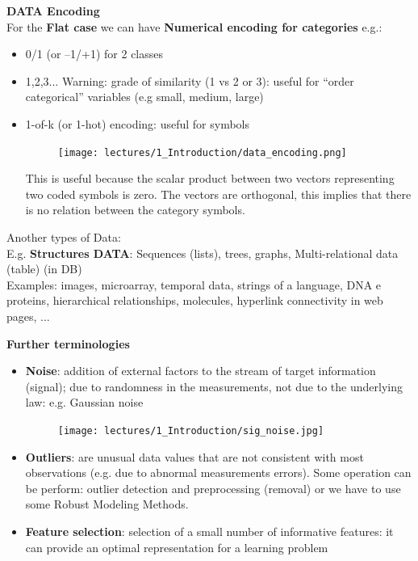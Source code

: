 \documentclass[../main.tex]{subfiles}
\begin{document}
\noindent\textbf{DATA Encoding}\\
For the \textbf{Flat case} we can have \textbf{Numerical encoding for categories} e.g.:
\begin{itemize}
    \item 0/1 (or –1/+1) for 2 classes
    \item 1,2,3... Warning: grade of similarity (1 vs 2 or 3): useful for “order
categorical” variables (e.g small, medium, large)
    \item 1-of-k (or 1-hot) encoding: useful for symbols

    \begin{figure}[H]
    \centering
    \texttt{[image: lectures/1\_Introduction/data\_encoding.png]}
    \end{figure}
    This is useful because the scalar product between two vectors representing two coded symbols is zero. The vectors are orthogonal, this implies that there is no relation between the category symbols.
\end{itemize}

\noindent Another types of Data:\\
\noindent E.g. \textbf{Structures DATA}: Sequences (lists), trees, graphs, Multi-relational data (table) (in DB)\\
Examples: images, microarray, temporal data, strings of a language, DNA e proteins, hierarchical relationships, molecules, hyperlink connectivity in web pages, ...

\noindent\textbf{Further terminologies}
\begin{itemize}
    \item \textbf{Noise}: addition of external factors to the stream of target information (signal); due to randomness in the measurements, not due to the underlying law: e.g. Gaussian noise
    
    \begin{figure}[H]
    \centering
    \texttt{[image: lectures/1\_Introduction/sig\_noise.jpg]}
    \end{figure}

    \item \textbf{Outliers}: are unusual data values that are not consistent with most observations (e.g. due to abnormal measurements errors). Some operation can be perform: outlier detection and preprocessing (removal) or we have to use some Robust Modeling Methods.
    \item \textbf{Feature selection}: selection of a small number of informative features: it can provide an optimal representation for a learning problem
\end{itemize}
\end{document}
